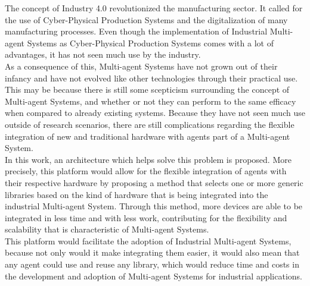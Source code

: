 
%

The concept of Industry 4.0 revolutionized the manufacturing sector. It called for the use of Cyber-Physical Production Systems and the digitalization of many manufacturing processes. Even though the implementation of Industrial Multi-agent Systems as Cyber-Physical Production Systems comes with a lot of advantages, it has not seen much use by the industry.\\

As a consequence of this, Multi-agent Systems have not grown out of their infancy and have not evolved like other technologies through their practical use. This may be because there is still some scepticism surrounding the concept of Multi-agent Systems, and whether or not they can perform to the same efficacy when compared to already existing systems. Because they have not seen much use outside of research scenarios, there are still complications regarding the flexible integration of new and traditional hardware with agents part of a Multi-agent System.\\

In this work, an architecture which helps solve this problem is proposed. More precisely, this platform would allow for the flexible integration of agents with their respective hardware by proposing a method that selects one or more generic libraries based on the kind of hardware that is being integrated into the industrial Multi-agent System. Through this method, more devices are able to be integrated in less time and with less work, contributing for the flexibility and scalability that is characteristic of Multi-agent Systems.\\

This platform would facilitate the adoption of Industrial Multi-agent Systems, because not only would it make integrating them easier, it would also mean that any agent could use and reuse any library, which would reduce time and costs in the development and adoption of Multi-agent Systems for industrial applications.\\

%
%

